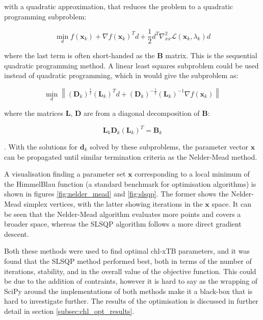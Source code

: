 with a quadratic approximation, that reduces the problem to a quadratic programming
subproblem:

\begin{equation}
\min_d f\left(\mathbf{x}_k\right) + \nabla f\left(\mathbf{x}_k\right)^T d + \frac{1}{2}d^T \nabla^2_{xx} \mathcal{L} \left(\mathbf{x}_k, \lambda_k \right) d
\end{equation}

where the last term is often short-handed as the $\mathbf{B}$ matrix. This is the 
sequential quadratic programming method. A linear least squares subproblem could
be used instead of quadratic programming, which in would give the subproblem as:

\begin{equation}
\min_d \left\| \left(\mathbf{D}_k\right)^{\frac{1}{2}} \left(\mathbf{L}_k\right)^T d + \left(\mathbf{D}_k\right)^{-\frac{1}{2}}\left(\mathbf{L}_k\right)^{-1}\nabla f \left(\mathbf{x}_k\right)\right\|
\end{equation}

where the matrices $\mathbf{L}$, $\mathbf{D}$ are from a diagonal decomposition 
of $\mathbf{B}$:

\begin{equation}
\mathbf{L}_k \mathbf{D}_k \left(\mathbf{L}_k\right)^T = \mathbf{B}_k
\end{equation}

. With the solutions for $\mathbf{d}_k$ solved by these subproblems, the parameter vector
$\mathbf{x}$ can be propagated until similar termination criteria as the Nelder-Mead
method.

A visualisation finding a parameter set $\mathbf{x}$ corresponding to a local minimum
of the HimmelBlau function (a standard benchmark for optimisation algorithms) is
shown in figures \ref{fig:nelder_mead} and \ref{fig:slsqp}. The former shows the 
Nelder-Mead simplex vertices, with the latter showing iterations in the $\mathbf{x}$
space. It can be seen that the Nelder-Mead algorithm evaluates more points and covers
a broader space, whereas the SLSQP algorithm follows a more direct gradient descent. 

Both these methods were used to find optimal chl-xTB parameters, and it was found 
that the SLSQP method performed best, both in terms of the number of iterations,
stability, and in the overall value of the objective function. This could be due 
to the addition of contraints, however it is hard to say as the wrapping of SciPy
around the implementations of both methods make it a black-box that is hard to 
investigate further. The results of the optimisation is discussed in further detail
in section \ref{subsec:chl_opt_results}.

